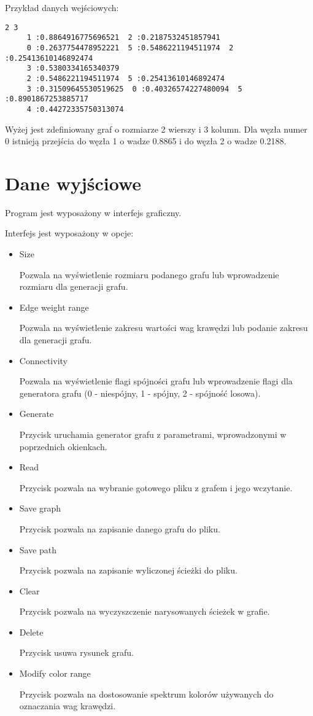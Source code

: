 \documentclass[]{article}
\begin{document}
Przykład danych wejściowych:

\begin{verbatim}
2 3
	 1 :0.8864916775696521  2 :0.2187532451857941 
	 0 :0.2637754478952221  5 :0.5486221194511974  2 :0.25413610146892474
	 3 :0.5380334165340379
	 2 :0.5486221194511974  5 :0.25413610146892474
	 3 :0.31509645530519625  0 :0.40326574227480094  5 :0.8901867253885717
	 4 :0.44272335750313074
\end{verbatim}
Wyżej jest zdefiniowany graf o rozmiarze 2 wierszy i 3 kolumn. Dla węzła numer 0 istnieją przejścia do węzła 1 o wadze 0.8865 i do węzła 2 o wadze 0.2188.

\section{Dane wyjściowe}\label{header-n279}
Program jest wyposażony w interfejs graficzny.

Interfejs jest wyposażony w opcje:
\begin{itemize}
    \item Size
    
    Pozwala na wyświetlenie rozmiaru podanego grafu lub wprowadzenie rozmiaru dla generacji grafu.
    \item Edge weight range
    
    Pozwala na wyświetlenie zakresu wartości wag krawędzi lub podanie zakresu dla generacji grafu.
    
    \item Connectivity
    
    Pozwala na wyświetlenie flagi spójności grafu lub wprowadzenie flagi dla generatora grafu (0 - niespójny, 1 - spójny, 2 - spójność losowa).
    \item Generate
    
    Przycisk uruchamia generator grafu z parametrami, wprowadzonymi w poprzednich okienkach.
    \item Read
    
    Przycisk pozwala na wybranie gotowego pliku z grafem i jego wczytanie.
    \item Save graph
    
    Przycisk pozwala na zapisanie danego grafu do pliku.
    \item Save path
    
    Przycisk pozwala na zapisanie wyliczonej ścieżki do pliku.
    \item Clear
    
    
    Przycisk pozwala na wyczyszczenie narysowanych ścieżek w grafie.
    \item Delete
    
    Przycisk usuwa rysunek grafu.
    \item Modify color range
    
    
    Przycisk pozwala na dostosowanie spektrum kolorów używanych do oznaczania wag krawędzi.
\end{itemize}
\end{document}
